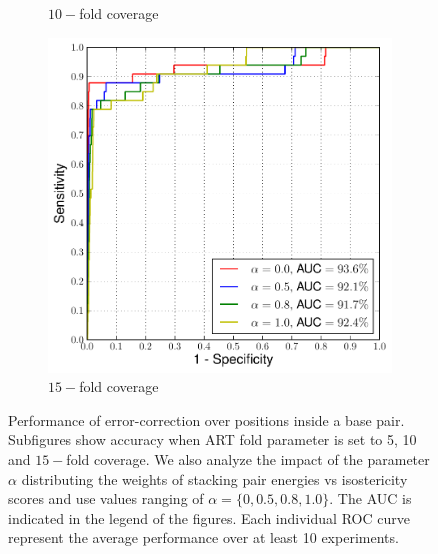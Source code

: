 \begin{figure}
\begin{subfigure}{.33\textwidth}
    \caption{$10-$fold coverage}
\end{subfigure}
\begin{subfigure}{.33\textwidth}
  \centering
  \includegraphics[width=\linewidth]{figures/15fold-b}
    \caption{$15-$fold coverage}
\end{subfigure}
\caption{Performance of error-correction over positions inside a base pair. Subfigures show accuracy when
ART fold parameter is set to 5, 10 and $15-$fold coverage. We also analyze the impact of the parameter $\alpha$ distributing the weights of stacking pair energies vs isostericity scores and use values ranging of $\alpha = \{0, 0.5, 0.8, 1.0\}$. The AUC is indicated in the legend of the figures. Each individual ROC curve represent the average performance over at least 10 experiments.}
\label{fig:16s_bp}
\end{figure}


